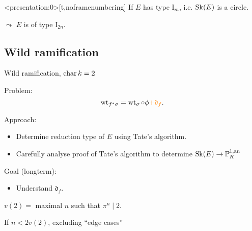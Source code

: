 \begin{frame}<presentation:0>[t,noframenumbering]
	If $E$ has type $\mathrm I_m$, i.e. $\operatorname{Sk}(E)$ is a circle.
	\begin{figure}
	\end{figure}
	\pause
    $\leadsto$ $E$ is of type $\mathrm I_{2n}$.
\end{frame}

\subsection{Wild ramification} \label{sec:wild_ramification}

\begin{frame}
	{Wild ramification, $\operatorname{char} k = 2$}

	Problem: \[
		\operatorname{wt}_{f^*\sigma} = \operatorname{wt}_{\sigma} \circ \phi {\color{orange} +  \mathfrak{d} _f}
	.\] 
	\medskip

	\pause

	Approach:
	\begin{itemize}
		\item Determine reduction type of $E $ using Tate's algorithm.
		\item Carefully analyse proof of Tate's algorithm to determine $\operatorname{Sk}(E) \to \mathbb P^{1, \text{an}}_{K}$
	\end{itemize}
	\pause 
	\bigskip

	Goal (longterm):
	\begin{itemize}
		\item Understand $\mathfrak{d} _f$.
	\end{itemize}
\end{frame}
\begin{frame}
	$v(2) =$ maximal $n$ such that $\pi^{n} \mid 2$.  

\begin{figure}[ht]
    \centering
\end{figure}

\end{frame}
\begin{frame}
	If $n < 2v(2)$, excluding ``edge cases''
\begin{figure}[ht]
    \centering
\end{figure}
\end{frame}

